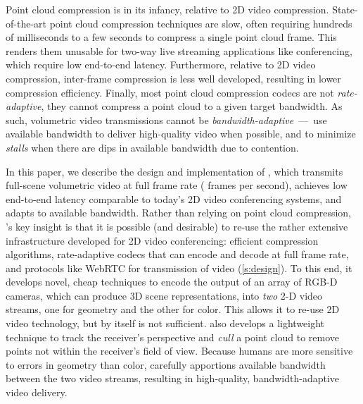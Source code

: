 Point cloud compression is in its infancy, relative to 2D video compression.
%
State-of-the-art point cloud compression techniques are slow, often requiring hundreds of milliseconds to a few seconds to compress a single point cloud frame.
%
This renders them unusable for two-way live streaming applications like conferencing, which require low end-to-end latency.
%
Furthermore, relative to 2D video compression, inter-frame compression is less well developed, resulting in lower compression efficiency.
%
Finally, most point cloud compression codecs are not \textit{rate-adaptive}, \ie they cannot compress a point cloud to a given target bandwidth.
%
As such, volumetric video transmissions cannot be \textit{bandwidth-adaptive}~---~use available bandwidth to deliver high-quality video when possible, and to minimize \textit{stalls} when there are dips in available bandwidth due to contention.

%
In this paper, we describe the design and implementation of \sysname, which transmits full-scene volumetric video at full frame rate ( frames per second), achieves low end-to-end latency comparable to today's 2D video conferencing systems, and adapts to available bandwidth.
%
Rather than relying on point cloud compression, \sysname's key insight is that it is possible (and desirable) to re-use the rather extensive infrastructure developed for 2D video conferencing: efficient compression algorithms, rate-adaptive codecs that can encode and decode at full frame rate, and protocols like WebRTC for transmission of video (\cref{s:design}).
%
To this end, it develops novel, cheap techniques to encode the output of an array of RGB-D cameras, which can produce 3D scene representations, into \textit{two} 2-D video streams, one for geometry and the other for color.
%
This allows it to re-use 2D video technology, but by itself is not sufficient.
%
\sysname also develops a lightweight technique to track the receiver's perspective and \textit{cull} a point cloud to remove points not within the receiver's field of view.
%
Because humans are more sensitive to errors in geometry than color, \sysname
carefully apportions available bandwidth between the two video streams, resulting in high-quality, bandwidth-adaptive video delivery.


